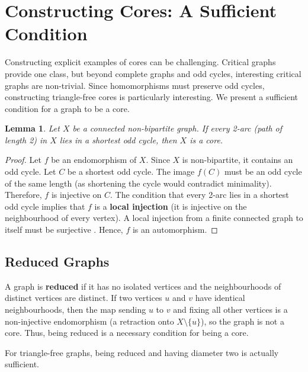 \documentclass[12pt,a4paper,openany]{book}
\newtheorem{lemma}{Lemma}[section]
\begin{document}
\section{Constructing Cores: A Sufficient Condition}

Constructing explicit examples of cores can be challenging. Critical graphs provide one class, but beyond complete graphs and odd cycles, interesting critical graphs are non-trivial. Since homomorphisms must preserve odd cycles, constructing triangle-free cores is particularly interesting. We present a sufficient condition for a graph to be a core.

\begin{lemma}\label{lem:local-injection-core}
Let $X$ be a connected non-bipartite graph. If every 2-arc (path of length 2) in $X$ lies in a shortest odd cycle, then $X$ is a core.
\end{lemma}
\begin{proof}
Let $f$ be an endomorphism of $X$. Since $X$ is non-bipartite, it contains an odd cycle. Let $C$ be a shortest odd cycle. The image $f(C)$ must be an odd cycle of the same length (as shortening the cycle would contradict minimality). Therefore, $f$ is injective on $C$. The condition that every 2-arc lies in a shortest odd cycle implies that $f$ is a \textbf{local injection} (it is injective on the neighbourhood of every vertex). A local injection from a finite connected graph to itself must be surjective . Hence, $f$ is an automorphism.
\end{proof}

\subsection{Reduced Graphs}

A graph is \textbf{reduced} if it has no isolated vertices and the neighbourhoods of distinct vertices are distinct. If two vertices $u$ and $v$ have identical neighbourhoods, then the map sending $u$ to $v$ and fixing all other vertices is a non-injective endomorphism (a retraction onto $X \setminus \{u\}$), so the graph is not a core. Thus, being reduced is a necessary condition for being a core.

For triangle-free graphs, being reduced and having diameter two is actually sufficient.
\end{document}
